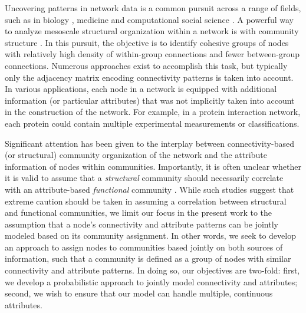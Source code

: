\documentclass[journal]{IEEEtran}
\begin{document}
Uncovering patterns in network data is a common pursuit across a range of fields, such as in biology \cite{dan}, medicine \cite{agha,cancer} and computational social science \cite{socialnetwork}. A powerful way to analyze mesoscale structural organization within a network is with community structure \cite{muchacommunity,jurecommunity,shaiCC,fortu1,fortu2}. In this pursuit, the objective is to identify cohesive groups of nodes with relatively high density of within-group connections and fewer between-group connections. Numerous approaches exist to accomplish this task, but typically only the adjacency matrix encoding connectivity patterns is taken into account. In various applications, each node in a network is equipped with additional information (or particular attributes) that was not implicitly taken into account in the construction of the network. For example, in a protein interaction network, each protein could contain multiple experimental measurements or classifications. 

Significant attention has been given to the interplay between connectivity-based (or structural) community organization of the network and the attribute information of nodes within communities. Importantly, it is often unclear whether it is valid to assume that a \emph{structural} community should necessarily correlate with an attribute-based \emph{functional} community \cite{hric,peel2017ground,jureGroundTruth}. While such studies suggest that extreme caution should be taken in assuming a correlation between structural and functional communities, we limit our focus in the present work to the assumption that a node's connectivity and attribute patterns can be jointly modeled based on its community assignment. In other words, we seek to develop an approach to assign nodes to communities based jointly on both sources of information, such that a community is defined as a group of nodes with similar connectivity and attribute patterns. In doing so, our objectives are two-fold: first, we develop a probabilistic approach to jointly model connectivity and attributes; second, we wish to ensure that our model can handle multiple, continuous attributes.  
\end{document}
